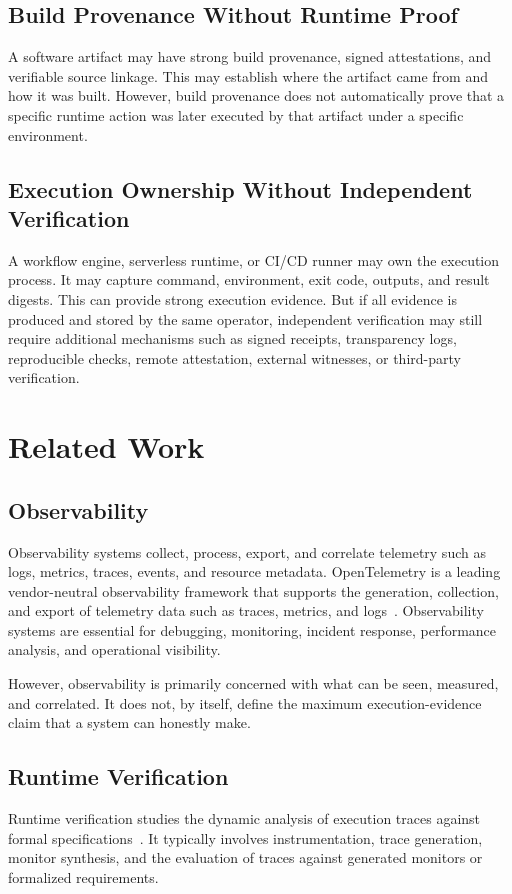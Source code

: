 \documentclass[11pt]{article}
\begin{document}
\subsection{Build Provenance Without Runtime Proof}
A software artifact may have strong build provenance, signed attestations, and verifiable source linkage. This may establish where the artifact came from and how it was built. However, build provenance does not automatically prove that a specific runtime action was later executed by that artifact under a specific environment.

\subsection{Execution Ownership Without Independent Verification}
A workflow engine, serverless runtime, or CI/CD runner may own the execution process. It may capture command, environment, exit code, outputs, and result digests. This can provide strong execution evidence. But if all evidence is produced and stored by the same operator, independent verification may still require additional mechanisms such as signed receipts, transparency logs, reproducible checks, remote attestation, external witnesses, or third-party verification.

\section{Related Work}

\subsection{Observability}
Observability systems collect, process, export, and correlate telemetry such as logs, metrics, traces, events, and resource metadata. OpenTelemetry is a leading vendor-neutral observability framework that supports the generation, collection, and export of telemetry data such as traces, metrics, and logs~\cite{opentelemetry_docs,opentelemetry_what_is}. Observability systems are essential for debugging, monitoring, incident response, performance analysis, and operational visibility.

However, observability is primarily concerned with what can be seen, measured, and correlated. It does not, by itself, define the maximum execution-evidence claim that a system can honestly make.

\subsection{Runtime Verification}
Runtime verification studies the dynamic analysis of execution traces against formal specifications~\cite{sanchez_runtime_verification,weil_runtime_interactions_2025}. It typically involves instrumentation, trace generation, monitor synthesis, and the evaluation of traces against generated monitors or formalized requirements.
\end{document}
